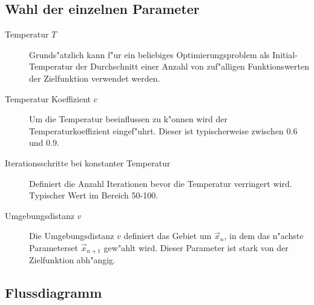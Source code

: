\subsection{Wahl der einzelnen Parameter}
\begin{description}
\item [Temperatur $T$] $ $\\
Grunds"atzlich kann f"ur ein beliebiges Optimierungsproblem als
Initial-Tem\-pe\-ratur der Durchschnitt einer Anzahl von zuf"alligen
Funktionswerten der Zielfunktion verwendet werden.
\item [Temperatur Koeffizient $c$] $ $\\
Um die Temperatur beeinflussen zu k"onnen wird der Temperaturkoeffizient
eingef"uhrt. Dieser ist typischerweise zwischen 0.6 und 0.9.

\item [Iterationsschritte bei konstanter Temperatur]$ $\\
Definiert die Anzahl Iterationen bevor die Temperatur verringert wird.
Typischer Wert im Bereich 50-100.

\item [Umgebungsdistanz $v$]$ $\\
Die Umgebungsdistanz $v$ definiert das Gebiet um $\vec{x}_{n}$,
in dem das n"achste Parameterset $\vec{x}_{n+1}$ gew"ahlt wird.
Dieser Parameter ist stark von der Zielfunktion abh"angig.
\end{description}
		
\clearpage


\subsection{Flussdiagramm}

